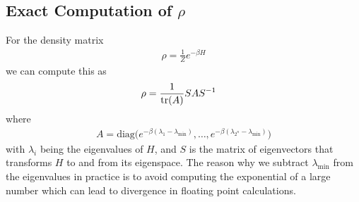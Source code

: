 \subsection{Exact Computation of \( \rho \)}\label{app:exact_rho_computation}
For the density matrix
\begin{align}
    \rho = \frac{1}{Z} e^{-\beta H}
\end{align}
we can compute this as
\begin{align}
    \rho
        &= \frac{1}{\text{tr}(A)} S A S^{-1}
\end{align}
where
\begin{align}
    A = \text{diag}\Big(e^{-\beta(\lambda_1 - \lambda_{\min})}, \dots, e^{-\beta(\lambda_{2^n} - \lambda_{\min})}\Big)
\end{align}
with \( \lambda_i \) being the eigenvalues of \( H \), and \( S \) is the matrix of eigenvectors that transforms \( H \) to and from its eigenspace.
The reason why we subtract \( \lambda_{\min} \) from the eigenvalues in practice is to avoid computing the exponential of a large number which can lead to divergence in floating point calculations.
